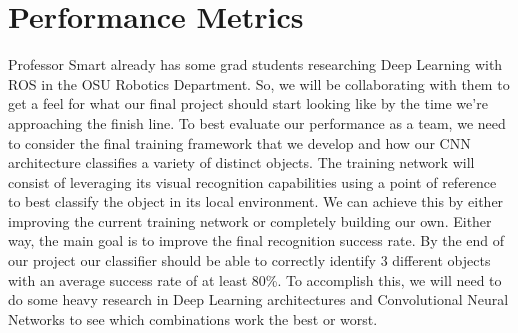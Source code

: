 \documentclass[a4paper, 10pt]{article}
\begin{document}
\section{Performance Metrics}
Professor Smart already has some grad students researching Deep Learning with ROS in the OSU Robotics Department. So, we will be collaborating with them to get a feel for what our final project should start looking like by the time we’re approaching the finish line. To best evaluate our performance as a team, we need to consider the final training framework that we develop and how our CNN architecture classifies a variety of distinct objects. The training network will consist of leveraging its visual recognition capabilities using a point of reference to best classify the object in its local environment. We can achieve this by either improving the current training network or completely building our own. Either way, the main goal is to improve the final recognition success rate. By the end of our project our classifier should be able to correctly identify 3 different objects with an average success rate of at least 80\%. To accomplish this, we will need to do some heavy research in Deep Learning architectures and Convolutional Neural Networks to see which combinations work the best or worst. 
\end{document}
